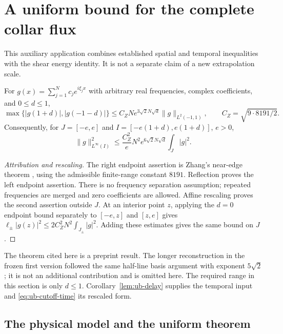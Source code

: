 \section{A uniform bound for the complete collar flux}
\label{sec:upper-bound}

This auxiliary application combines established spatial and temporal
inequalities with the shear energy identity. It is not a separate claim
of a new extrapolation scale.

\begin{lemma}\label{thm:ub-edge}
For $g(x)=\sum_{j=1}^N c_j e^{i\xi_jx}$ with arbitrary real frequencies,
complex coefficients, and $0\le d\le1$,
\begin{equation}\label{eq:ub-edge}
 \max\{|g(1+d)|,|g(-1-d)|\}
 \le C_ZN e^{3\sqrt2N\sqrt d}\|g\|_{L^2(-1,1)},
 \qquad C_Z=\sqrt{9\cdot8191/2}.
\end{equation}
Consequently, for $J=[-e,e]$ and $I=[-e(1+d),e(1+d)]$, $e>0$,
\begin{equation}\label{eq:ub-affine-edge}
 \|g\|_{L^\infty(I)}^2
 \le\frac{C_Z^2}{e}N^2e^{6\sqrt2N\sqrt d}\int_J|g|^2.
\end{equation}
\end{lemma}

\begin{proof}[Attribution and rescaling]
The right endpoint assertion is Zhang's near-edge theorem
\cite[Theorem 1.1 and Proposition 4.2, v1]{Zhang2026}, using the
admissible finite-range constant $8191$. Reflection proves the left
endpoint assertion. There is no frequency separation assumption;
repeated frequencies are merged and zero coefficients are allowed.
Affine rescaling proves the second assertion outside $J$. At an
interior point $z$, applying the $d=0$ endpoint bound separately to
$[-e,z]$ and $[z,e]$ gives
$\ell_\pm|g(z)|^2\le2C_Z^2N^2\int_{J_\pm}|g|^2$.
Adding these estimates gives the same bound on $J$.
\end{proof}

The theorem cited here is a preprint result. The longer reconstruction
in the frozen first version followed the same half-line basis argument
with exponent $5\sqrt2$; it is not an additional contribution and is
omitted here. The required range in this section is only $d\le1$.
Corollary~\ref{lem:ub-delay} supplies the temporal input and
\eqref{eq:ub-cutoff-time} its rescaled form.

\subsection{The physical model and the uniform theorem}

